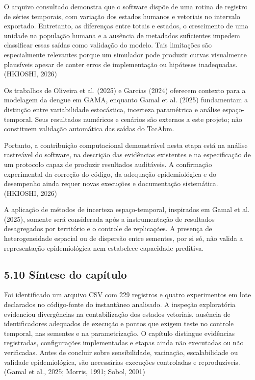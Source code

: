 O arquivo consultado demonstra que o software dispõe de uma rotina de
registro de séries temporais, com variação dos estados humanos e
vetoriais no intervalo exportado. Entretanto, as diferenças entre totais
e estados, o crescimento de uma unidade na população humana e a ausência
de metadados suficientes impedem classificar essas saídas como validação
do modelo. Tais limitações são especialmente relevantes porque um
simulador pode produzir curvas visualmente plausíveis apesar de conter
erros de implementação ou hipóteses inadequadas. (HKIOSHI, 2026)

Os trabalhos de Oliveira et al. (2025) e Garcias (2024) oferecem
contexto para a modelagem da dengue em GAMA, enquanto Gamal et al.
(2025) fundamentam a distinção entre variabilidade estocástica,
incerteza paramétrica e análise espaço-temporal. Seus resultados
numéricos e cenários são externos a este projeto; não constituem
validação automática das saídas do TccAbm.

Portanto, a contribuição computacional demonstrável nesta etapa está na
análise rastreável do software, na descrição das evidências existentes e
na especificação de um protocolo capaz de produzir resultados
auditáveis. A confirmação experimental da correção do código, da
adequação epidemiológica e do desempenho ainda requer novas execuções e
documentação sistemática. (HKIOSHI, 2026)

A aplicação de métodos de incerteza espaço-temporal, inspirados em Gamal
et al. (2025), somente será considerada após a instrumentação de
resultados desagregados por território e o controle de replicações. A
presença de heterogeneidade espacial ou de dispersão entre sementes, por
si só, não valida a representação epidemiológica nem estabelece
capacidade preditiva.

\subsection{5.10 Síntese do capítulo}\label{suxedntese-do-capuxedtulo-3}

Foi identificado um arquivo CSV com 229 registros e quatro experimentos
em lote declarados no código-fonte do instantâneo analisado. A inspeção
exploratória evidenciou divergências na contabilização dos estados
vetoriais, ausência de identificadores adequados de execução e pontos
que exigem teste no controle temporal, nas sementes e na parametrização.
O capítulo distingue evidências registradas, configurações implementadas
e etapas ainda não executadas ou não verificadas. Antes de concluir
sobre sensibilidade, vacinação, escalabilidade ou validade
epidemiológica, são necessárias execuções controladas e reproduzíveis.
(Gamal et al., 2025; Morris, 1991; Sobol, 2001)

